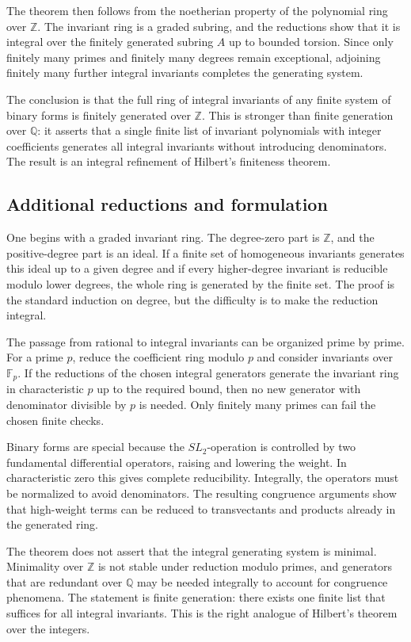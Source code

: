 \documentclass[11pt]{article}
\begin{document}
The theorem then follows from the noetherian property of the polynomial ring over \(\mathbb Z\). The
invariant ring is a graded subring, and the reductions show that it is integral over the finitely
generated subring \(A\) up to bounded torsion. Since only finitely many primes and finitely many
degrees remain exceptional, adjoining finitely many further integral invariants completes the
generating system.


The conclusion is that the full ring of integral invariants of any finite system of binary forms is
finitely generated over \(\mathbb Z\). This is stronger than finite generation over \(\mathbb Q\):
it asserts that a single finite list of invariant polynomials with integer coefficients generates
all integral invariants without introducing denominators. The result is an integral refinement of
Hilbert's finiteness theorem.


\subsection{Additional reductions and formulation}

One begins with a graded invariant ring. The degree-zero part is \(\mathbb Z\), and the
positive-degree part is an ideal. If a finite set of homogeneous invariants generates this ideal up
to a given degree and if every higher-degree invariant is reducible modulo lower degrees, the whole
ring is generated by the finite set. The proof is the standard induction on degree, but the
difficulty is to make the reduction integral.

The passage from rational to integral invariants can be organized prime by prime. For a prime \(p\),
reduce the coefficient ring modulo \(p\) and consider invariants over \(\mathbb F_p\). If the
reductions of the chosen integral generators generate the invariant ring in characteristic \(p\) up
to the required bound, then no new generator with denominator divisible by \(p\) is needed. Only
finitely many primes can fail the chosen finite checks.

Binary forms are special because the \(SL_2\)-operation is controlled by two fundamental
differential operators, raising and lowering the weight. In characteristic zero this gives complete
reducibility. Integrally, the operators must be normalized to avoid denominators. The resulting
congruence arguments show that high-weight terms can be reduced to transvectants and products
already in the generated ring.

The theorem does not assert that the integral generating system is minimal. Minimality over
\(\mathbb Z\) is not stable under reduction modulo primes, and generators that are redundant over
\(\mathbb Q\) may be needed integrally to account for congruence phenomena. The statement is finite
generation: there exists one finite list that suffices for all integral invariants. This is the
right analogue of Hilbert's theorem over the integers.
\end{document}

